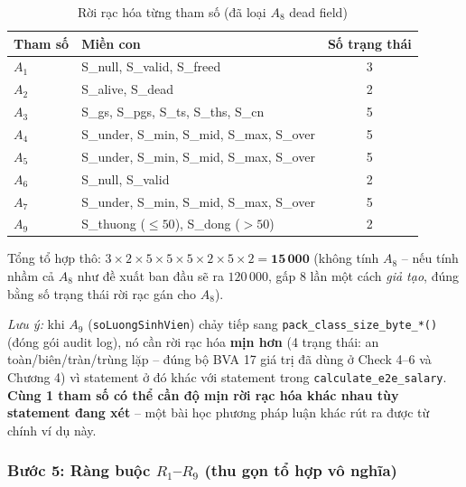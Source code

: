 \begin{table}[H]
  \centering
  \caption{Rời rạc hóa từng tham số (đã loại $A_8$ dead field)}
  \label{tab:discretize}
  \small
  \begin{tabular}{@{}l l c@{}}
    \toprule
    \textbf{Tham số} & \textbf{Miền con} & \textbf{Số trạng thái} \\
    \midrule
    $A_1$ & S\_null, S\_valid, S\_freed & 3 \\
    $A_2$ & S\_alive, S\_dead & 2 \\
    $A_3$ & S\_gs, S\_pgs, S\_ts, S\_ths, S\_cn & 5 \\
    $A_4$ & S\_under, S\_min, S\_mid, S\_max, S\_over & 5 \\
    $A_5$ & S\_under, S\_min, S\_mid, S\_max, S\_over & 5 \\
    $A_6$ & S\_null, S\_valid & 2 \\
    $A_7$ & S\_under, S\_min, S\_mid, S\_max, S\_over & 5 \\
    $A_9$ & S\_thuong ($\le 50$), S\_dong ($>50$) & 2 \\
    \bottomrule
  \end{tabular}
\end{table}

Tổng tổ hợp thô: $3\times2\times5\times5\times5\times2\times5\times2 = \mathbf{15\,000}$ (không tính $A_8$ -- nếu tính nhầm cả $A_8$ như đề xuất ban đầu sẽ ra $120\,000$, gấp 8 lần một cách \emph{giả tạo}, đúng bằng số trạng thái rời rạc gán cho $A_8$).

\emph{Lưu ý:} khi $A_9$ (\texttt{soLuongSinhVien}) chảy tiếp sang \texttt{pack\_class\_size\_byte\_*()} (đóng gói audit log), nó cần rời rạc hóa \textbf{mịn hơn} (4 trạng thái: an toàn/biên/tràn/trùng lặp -- đúng bộ BVA 17 giá trị đã dùng ở Check 4--6 và Chương 4) vì statement ở đó khác với statement trong \texttt{calculate\_e2e\_salary}. \textbf{Cùng 1 tham số có thể cần độ mịn rời rạc hóa khác nhau tùy statement đang xét} -- một bài học phương pháp luận khác rút ra được từ chính ví dụ này.

\subsubsection*{Bước 5: Ràng buộc $R_1$--$R_9$ (thu gọn tổ hợp vô nghĩa)}

